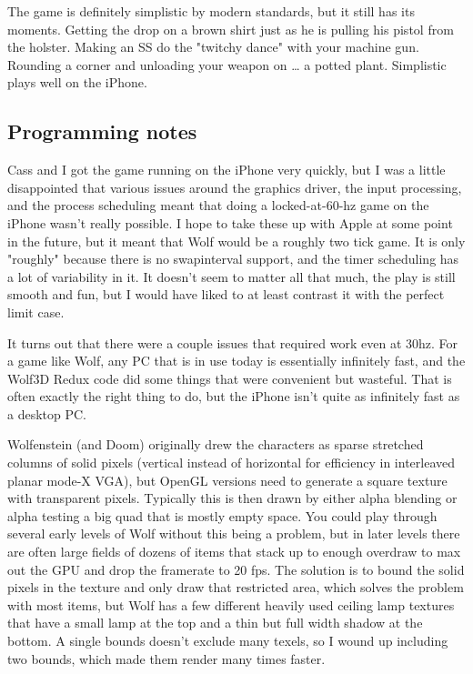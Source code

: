 The game is definitely simplistic by modern standards, but it still has its moments.  Getting the drop on a brown shirt just as he is pulling his pistol from the holster.  Making an SS do the "twitchy dance" with your machine gun.  Rounding a corner and unloading your weapon on … a potted plant.  Simplistic plays well on the iPhone.\\
\par

\subsection{Programming notes}
Cass and I got the game running on the iPhone very quickly, but I was a little disappointed that various issues around the graphics driver, the input processing, and the process scheduling meant that doing a locked-at-60-hz game on the iPhone wasn't really possible.  I hope to take these up with Apple at some point in the future, but it meant that Wolf would be a roughly two tick game.  It is only "roughly" because there is no swapinterval support, and the timer scheduling has a lot of variability in it.  It doesn't seem to matter all that much, the play is still smooth and fun, but I would have liked to at least contrast it with the perfect limit case.\\
\par

It turns out that there were a couple issues that required work even at 30hz.  For a game like Wolf, any PC that is in use today is essentially infinitely fast, and the Wolf3D Redux code did some things that were convenient but wasteful.  That is often exactly the right thing to do, but the iPhone isn't quite as infinitely fast as a desktop PC.\\
\par

Wolfenstein (and Doom) originally drew the characters as sparse stretched columns of solid pixels (vertical instead of horizontal for efficiency in interleaved planar mode-X VGA), but OpenGL versions need to generate a square texture with transparent pixels.  Typically this is then drawn by either alpha blending or alpha testing a big quad that is mostly empty space.  You could play through several early levels of Wolf without this being a problem, but in later levels there are often large fields of dozens of items that stack up to enough overdraw to max out the GPU and drop the framerate to 20 fps.  The solution is to bound the solid pixels in the texture and only draw that restricted area, which solves the problem with most items, but Wolf has a few different heavily used ceiling lamp textures that have a small lamp at the top and a thin but full width shadow at the bottom.  A single bounds doesn't exclude many texels, so I wound up including two bounds, which made them render many times faster.\\
\par


